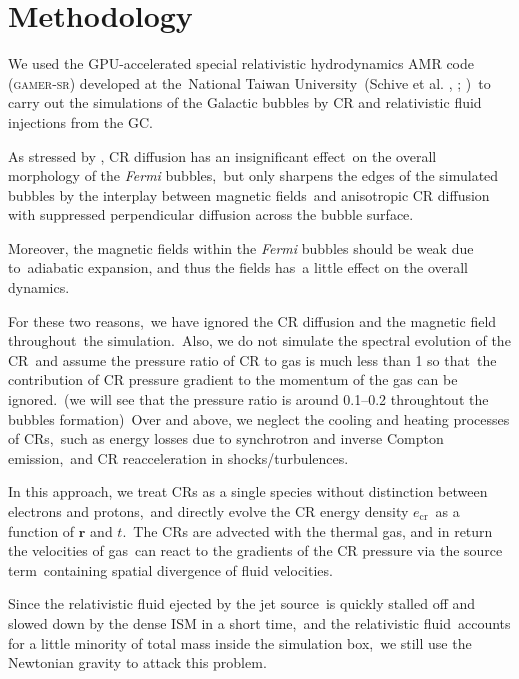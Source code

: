 \documentclass[twocolumn]{aastex631}
\begin{document}
\section{Methodology}
\label{Methodology}
  We used the GPU-accelerated special relativistic hydrodynamics AMR code (\textsc{gamer-sr}) developed at the\
  National Taiwan University\
  (Schive et al. \citeyear{gamer-1}, \citeyear{gamer-2}; \citeauthor{tseng2021} \citeyear{tseng2021})\
  to carry out the simulations of the Galactic bubbles by CR and relativistic fluid injections from the GC.

  As stressed by \citet{Yang2012}, CR diffusion has an insignificant effect\
  on the overall morphology of the \textit{Fermi} bubbles,\
  but only sharpens the edges of the simulated bubbles by the interplay between magnetic fields\
  and anisotropic CR diffusion with suppressed perpendicular diffusion across the bubble surface.

  Moreover, the magnetic fields within the \textit{Fermi} bubbles should be weak due to\
  adiabatic expansion, and thus the fields has\
  a little effect on the overall dynamics.

  For these two reasons,\
  we have ignored the CR diffusion and the magnetic field throughout\
  the simulation.\
  Also, we do not simulate the spectral evolution of the CR\
  and assume the pressure ratio of CR to gas is much less than 1 so that\
  the contribution of CR pressure gradient to the momentum of the gas can be ignored.\
  (we will see that the pressure ratio is around 0.1--0.2 throughtout the bubbles formation)\
  Over and above, we neglect the cooling and heating processes of CRs,\
  such as energy losses due to synchrotron and inverse Compton emission,\
  and CR reacceleration in shocks/turbulences.

  In this approach, we treat CRs as a single species without distinction between electrons and protons,\
  and directly evolve the CR energy density $e_{\text{cr}}$\
  as a function of $\mathbf{r}$ and $t$.\
  The CRs are advected with the thermal gas, and in return the velocities of gas\
  can react to the gradients of the CR pressure via the source term\
  containing spatial divergence of fluid velocities.


  Since the relativistic fluid ejected by the jet source\
  is quickly stalled off and slowed down by the dense ISM in a short time,\
  and the relativistic fluid\
  accounts for a little minority of total mass inside the simulation box,\
  we still use the Newtonian gravity to attack this problem.
\end{document}

